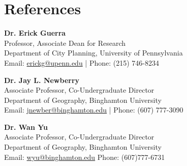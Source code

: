\documentclass[11pt]{article}
\begin{document}
\section*{References}
\noindent
\textbf{Dr. Erick Guerra} \\
Professor, Associate Dean for Research \\
Department of City Planning, University of Pennsylvania \\
Email: \href{mailto:erickg@upenn.edu}{erickg@upenn.edu} \quad | \quad Phone: (215) 746-8234

\vspace{2mm}
\noindent
\textbf{Dr. Jay L. Newberry} \\
Associate Professor, Co-Undergraduate Director \\
Department of Geography, Binghamton University \\
Email: \href{mailto:jnewber@binghamton.edu}{jnewber@binghamton.edu} | Phone: (607) 777-3090


\vspace{2mm}
\noindent
\textbf{Dr. Wan Yu} \\
Associate Professor, Co-Undergraduate Director \\
Department of Geography, Binghamton University \\
Email: \href{mailto:wyu@binghamton.edu}{wyu@binghamton.edu} 
Phone: (607)777-6731
\end{document}
